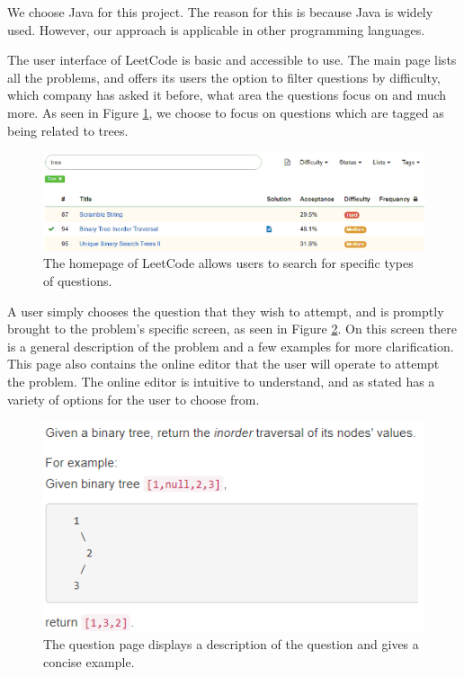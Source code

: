 \documentclass[conference]{IEEEtran}
\begin{document}
We choose Java for this project. The reason for this is because Java is widely used. However, our approach is applicable in other programming languages. 

The user interface of LeetCode is basic and accessible to use. The main page lists all the problems, and offers its users the option to filter questions by difficulty, which company has asked it before, what area the questions focus on and much more. As seen in Figure \ref{fig:homepage}, we choose to focus on questions which are tagged as being related to trees.


\begin{figure}[h]
\includegraphics[scale=0.35]{homepageUI}
\caption{The homepage of LeetCode allows users to search for specific types of questions.}
\label{fig:homepage}
\end{figure}

A user simply chooses the question that they wish to attempt, and is promptly brought to the problem's specific screen, as seen in Figure \ref{fig:problemPage}. On this screen there is a general description of the problem and a few examples for more clarification. This page also contains the online editor that the user will operate to attempt the problem. The online editor is intuitive to understand, and as stated has a variety of options for the user to choose from. 
\begin{figure}[h]
\includegraphics[scale=0.5]{problemPage}
\caption{The question page displays a description of the question and gives a concise example.}
\label{fig:problemPage}
\end{figure}
\end{document}
